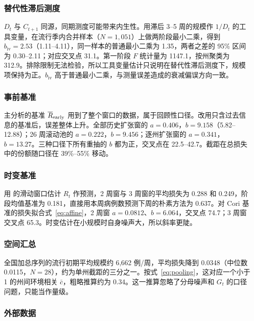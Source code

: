 \subsubsection{替代性滞后测度}

$D_t$ 与 $C_{t+1}$ 同源，同期测度可能带来内生性。用滞后 3--5 周的规模作 $1/D_t$ 的工具变量，在流行季内合并样本（$N=1{,}051$）上做两阶段最小二乘\citep{wooldridge2010econometric}，得到 $b_{\mathrm{iv}}=2.53$（1.11--4.11），同一样本的普通最小二乘为 1.35，两者之差的 95\% 区间为 0.30--2.11；对应交叉点 31.1。第一阶段 $F$ 统计量为 1147.1，按州聚类为 312.9。排除限制无法检验，所以工具变量估计只说明在替代性滞后测度下，规模项保持为正。$b_{\mathrm{iv}}$ 高于普通最小二乘，与测量误差造成的衰减偏误方向一致\citep{fuller1987measurement}。

\subsubsection{事前基准}

主分析的基准 $\overline{R}_{\mathrm{early}}$ 用到了整个窗口的数据，属于回顾性口径。改用只含过去信息的基准后，误差整体上升。全部历史扩张窗的 $a=0.406$，$b=9.158$（5.82--12.88）；26 周滚动池的 $a=0.222$，$b=9.456$；逐州扩张窗的 $a=0.341$，$b=13.27$。三种口径下所有重抽的 $b$ 都为正，交叉点在 22.5--42.7。截距在总损失中的份额随口径在 39\%--55\% 移动。

\subsubsection{时变基准}

用 \citet{cori2013new} 的滑动窗口估计 $R_t$ 作预测，2 周窗与 3 周窗的平均损失为 0.288 和 0.249，阶段均值基准为 0.181，直接用本周病例数预测下周的朴素方法为 0.637。对 Cori 基准的损失拟合式~\eqref{eq:affine}，2 周窗 $a=0.0812$、$b=6.064$，交叉点 74.7；3 周窗交叉点 65.3。时变估计在小规模时自身噪声大，所以斜率更陡。

\subsubsection{空间汇总}

全国加总序列的流行初期平均规模约 6,662 例/周，平均损失降到 0.0348（中位数 0.0115，$N=28$），约为单州截距的三分之一。按式~\eqref{eq:pooling}，这对应一个小于 1 的州间环境相关 $\bar c$，粗略推算约为 0.34。这一推算忽略了分母噪声和 $G_t$ 的口径问题，只能当作量级。

\subsubsection{外部数据}

